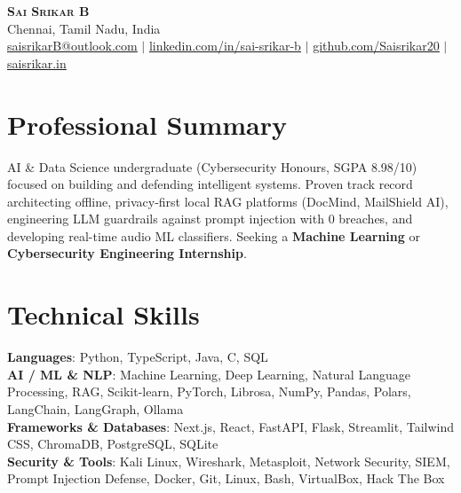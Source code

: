 \documentclass[letterpaper,10pt]{article}
\begin{document}
\begin{center}
  \textbf{\Huge \scshape Sai Srikar B} \\ \vspace{2pt}
  \small
  Chennai, Tamil Nadu, India \\ \vspace{1pt}
  \href{mailto:saisrikarB@outlook.com}{\underline{saisrikarB@outlook.com}} $|$
  \href{https://linkedin.com/in/sai-srikar-b-54b1b8359}{\underline{linkedin.com/in/sai-srikar-b}} $|$
  \href{https://github.com/Saisrikar20}{\underline{github.com/Saisrikar20}} $|$
  \href{https://saisrikar.in}{\underline{saisrikar.in}}
\end{center}

\section{Professional Summary}
  \small{AI \& Data Science undergraduate (Cybersecurity Honours, SGPA 8.98/10) focused on building and defending intelligent systems. Proven track record architecting offline, privacy-first local RAG platforms (DocMind, MailShield AI), engineering LLM guardrails against prompt injection with 0 breaches, and developing real-time audio ML classifiers. Seeking a \textbf{Machine Learning} or \textbf{Cybersecurity Engineering Internship}.}

\section{Technical Skills}
\begin{itemize}[leftmargin=0.15in, label={}]
  \small{\item{
    \textbf{Languages}{: Python, TypeScript, Java, C, SQL} \\
    \textbf{AI / ML \& NLP}{: Machine Learning, Deep Learning, Natural Language Processing, RAG, Scikit-learn, PyTorch, Librosa, NumPy, Pandas, Polars, LangChain, LangGraph, Ollama} \\
    \textbf{Frameworks \& Databases}{: Next.js, React, FastAPI, Flask, Streamlit, Tailwind CSS, ChromaDB, PostgreSQL, SQLite} \\
    \textbf{Security \& Tools}{: Kali Linux, Wireshark, Metasploit, Network Security, SIEM, Prompt Injection Defense, Docker, Git, Linux, Bash, VirtualBox, Hack The Box}
  }}
\end{itemize}
\end{document}
